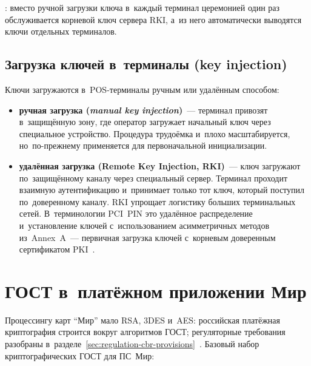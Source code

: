 : вместо ручной
загрузки ключа в~каждый терминал церемонией один раз обслуживается корневой
ключ сервера RKI, а~из него автоматически выводятся ключи отдельных
терминалов.

\subsection*{Загрузка ключей в~терминалы (key injection)}

Ключи загружаются в~POS-терминалы ручным или удалённым способом:

\begin{itemize}
  \item \textbf{ручная загрузка (\textit{manual key injection})}~--- терминал привозят
    в~защищённую зону, где оператор загружает начальный ключ через
    специальное устройство. Процедура трудоёмка и~плохо масштабируется,
    но~по-прежнему применяется для первоначальной инициализации.
  \item \textbf{удалённая загрузка (Remote Key Injection, RKI)}~--- ключ
    загружают по~защищённому каналу через специальный сервер. Терминал
    проходит взаимную аутентификацию и~принимает только тот ключ, который
    поступил по~доверенному каналу. RKI упрощает логистику больших
    терминальных сетей. В~терминологии PCI~PIN это удалённое распределение
    и~установление ключей с~использованием асимметричных методов
    из~Annex~A~--- первичная загрузка ключей с~корневым доверенным
    сертификатом PKI~\cite{pci-pin-security}.
\end{itemize}

\FloatBarrier
\section{ГОСТ в~платёжном приложении Мир}\label{sec:crypto-gost}

Процессингу карт \enquote{Мир} мало RSA, 3DES и~AES: российская платёжная
криптография строится вокруг алгоритмов ГОСТ;
регуляторные требования разобраны
в~разделе~\ref{sec:regulation-cbr-provisions}~\cite{cbr-821p,cbr-851p}. Базовый
набор криптографических ГОСТ для ПС~Мир:

